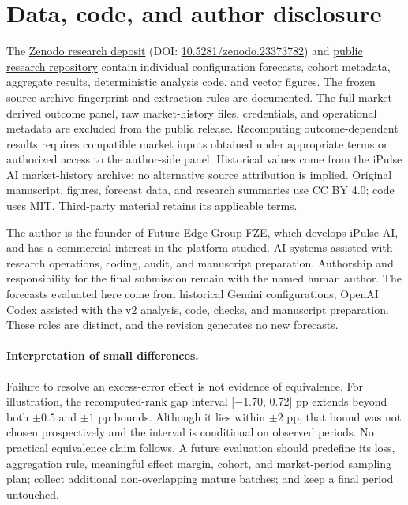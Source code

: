 \documentclass[11pt]{article}
\begin{document}
\section*{Data, code, and author disclosure}
The \href{https://doi.org/10.5281/zenodo.23373782}{Zenodo research deposit} (DOI: \href{https://doi.org/10.5281/zenodo.23373782}{10.5281/zenodo.23373782}) and \href{https://github.com/TheFutureEdge/research-when-ai-advisors-agree}{public research repository} contain individual configuration forecasts, cohort metadata, aggregate results, deterministic analysis code, and vector figures. The frozen source-archive fingerprint and extraction rules are documented. The full market-derived outcome panel, raw market-history files, credentials, and operational metadata are excluded from the public release. Recomputing outcome-dependent results requires compatible market inputs obtained under appropriate terms or authorized access to the author-side panel. Historical values come from the iPulse AI market-history archive; no alternative source attribution is implied. Original manuscript, figures, forecast data, and research summaries use CC BY 4.0; code uses MIT. Third-party material retains its applicable terms.

The author is the founder of Future Edge Group FZE, which develops iPulse AI, and has a commercial interest in the platform studied. AI systems assisted with research operations, coding, audit, and manuscript preparation. Authorship and responsibility for the final submission remain with the named human author. The forecasts evaluated here come from historical Gemini configurations; OpenAI Codex assisted with the v2 analysis, code, checks, and manuscript preparation. These roles are distinct, and the revision generates no new forecasts.

\paragraph{Interpretation of small differences.} Failure to resolve an excess-error effect is not evidence of equivalence. For illustration, the recomputed-rank gap interval [$-1.70$, 0.72] pp extends beyond both $\pm0.5$ and $\pm1$ pp bounds. Although it lies within $\pm2$ pp, that bound was not chosen prospectively and the interval is conditional on observed periods. No practical equivalence claim follows. A future evaluation should predefine its loss, aggregation rule, meaningful effect margin, cohort, and market-period sampling plan; collect additional non-overlapping mature batches; and keep a final period untouched.
\end{document}
